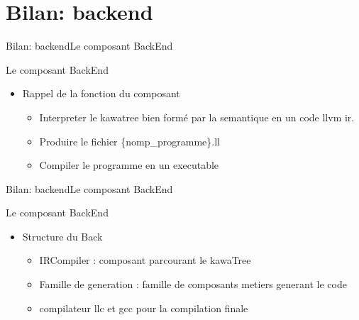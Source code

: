\section{Bilan: backend}
    \begin{frame}{Bilan: backend}{Le composant BackEnd}
    	\begin{block}{Le composant BackEnd}
	    	\begin{itemize}
				\item<1-> Rappel de la fonction du composant
				\begin{itemize}
					\item<2-> Interpreter le kawatree bien formé par la semantique en un code llvm ir.
				  	\item<3-> Produire le fichier \{nomp\_programme\}.ll
				  	\item<4-> Compiler le programme en un executable
				\end{itemize}
	    	\end{itemize}
	    \end{block}
	\end{frame}
	\begin{frame}{Bilan: backend}{Le composant BackEnd}
    	\begin{block}{Le composant BackEnd}
	    	\begin{itemize}

				\item<1-> Structure du Back
				 \begin{itemize}
				 	\item<2-> IRCompiler : composant parcourant le kawaTree
				  	\item<3-> Famille de generation : famille de composants metiers generant le code
				  	\item<4-> compilateur llc et gcc pour la compilation finale
				 	
				 \end{itemize}
	    	\end{itemize}
	    \end{block}
    \end{frame}

